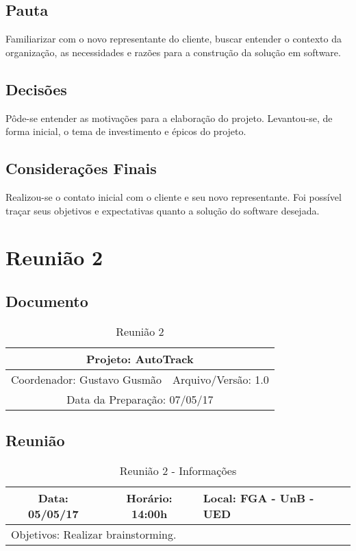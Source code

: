 \begin{apendicesenv}
\subsection{Pauta}
Familiarizar com o novo representante do cliente, buscar entender o contexto da organização, as
necessidades e razões para a construção da solução em software.

\subsection{Decisões}
Pôde-se entender as motivações para a elaboração do projeto. Levantou-se, de forma inicial, o tema de investimento
 e épicos do projeto.

 \subsection{Considerações Finais}
 Realizou-se o contato inicial com o cliente e seu novo representante. Foi possível traçar seus
  objetivos e expectativas quanto a solução do software desejada.


\section{Reunião 2}
\subsection{Documento}
\begin{table}[h]
  \centering
  \caption{Reunião 2}
  \begin{tabular}{|c|c|}
  \hline
  \multicolumn{2}{|c|}{Projeto: AutoTrack}                   \\ \hline
  Coordenador: Gustavo Gusmão & Arquivo/Versão: 1.0 \\ \hline
  \multicolumn{2}{|c|}{Data da Preparação: 07/05/17}         \\ \hline
  \end{tabular}
\end{table}

\subsection{Reunião}
\begin{table}[h]
  \centering
  \caption{Reunião 2 - Informações}
  \begin{tabular}{|l|c|l|}
  \hline
  \multicolumn{1}{|c|}{Data: 05/05/17}      & Horário: 14:00h     & Local: FGA - UnB - UED     \\ \hline
  \multicolumn{3}{|l|}{Objetivos: Realizar brainstorming.} \\ \hline
  \end{tabular}
\end{table}


\end{apendicesenv}
